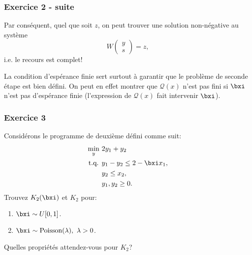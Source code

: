 \begin{frame}
	\frametitle{Exercice 2 - suite}
	
	Par conséquent, quel que soit $z$, on peut trouver une solution
	non-négative au système
	\[
	W\begin{pmatrix} y \\ s \end{pmatrix} = z,
	\]
	i.e. le recours est complet!
	
	
	
	
	La condition d'espérance finie sert surtout à garantir que le problème
	de seconde étape est bien défini.
	On peut en effet montrer que $\mathcal{Q}(x)$ n'est pas fini si
	$\bxi$ n'est pas d'espérance finie (l'expression de $\mathcal{Q}(x)$
	fait intervenir $\bxi$).
	
\end{frame}

\begin{frame}
	\frametitle{Exercice 3}
	
	Considérons le programme de deuxième défini comme suit:
	\begin{align*}
	\min_y\ & 2y_1+y_2\\
	\mbox{t.q. } & y_1 - y_2 \leq 2-\bxi x_1,\\
	& y_2 \leq x_2,\\
	& y_1, y_2 \geq 0.
	\end{align*}
	Trouvez $K_2(\bxi)$ et $K_2$ pour:
	\begin{enumerate}
		\item
		$\bxi \sim U[0,1]$.
		\item
		$\bxi \sim \mbox{Poisson}(\lambda),\ \lambda > 0$.
	\end{enumerate}
	Quelles propriétés attendez-vous pour $K_2$?
	
\end{frame}

